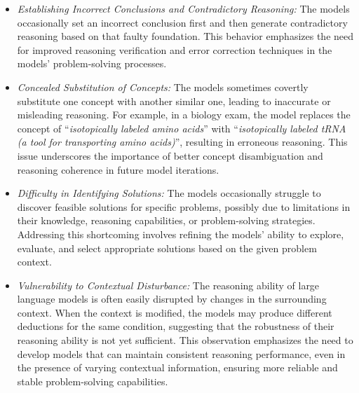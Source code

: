 \begin{itemize}
\item \textit{Establishing Incorrect Conclusions and Contradictory Reasoning:} The models occasionally set an incorrect conclusion first and then generate contradictory reasoning based on that faulty foundation. This behavior emphasizes the need for improved reasoning verification and error correction techniques in the models' problem-solving processes.

\item \textit{Concealed Substitution of Concepts:} The models sometimes covertly substitute one concept with another similar one, leading to inaccurate or misleading reasoning. For example, in a biology exam, the model replaces the concept of ``\textit{isotopically labeled amino acids}'' with ``\textit{isotopically labeled tRNA (a tool for transporting amino acids)}'', resulting in erroneous reasoning. This issue underscores the importance of better concept disambiguation and reasoning coherence in future model iterations. 

\item \textit{Difficulty in Identifying Solutions:} The models occasionally struggle to discover feasible solutions for specific problems, possibly due to limitations in their knowledge, reasoning capabilities, or problem-solving strategies. Addressing this shortcoming involves refining the models' ability to explore, evaluate, and select appropriate solutions based on the given problem context.

\item \textit{Vulnerability to Contextual Disturbance:} The reasoning ability of large language models is often easily disrupted by changes in the surrounding context. When the context is modified, the models may produce different deductions for the same condition, suggesting that the robustness of their reasoning ability is not yet sufficient. This observation emphasizes the need to develop models that can maintain consistent reasoning performance, even in the presence of varying contextual information, ensuring more reliable and stable problem-solving capabilities.
\end{itemize}

